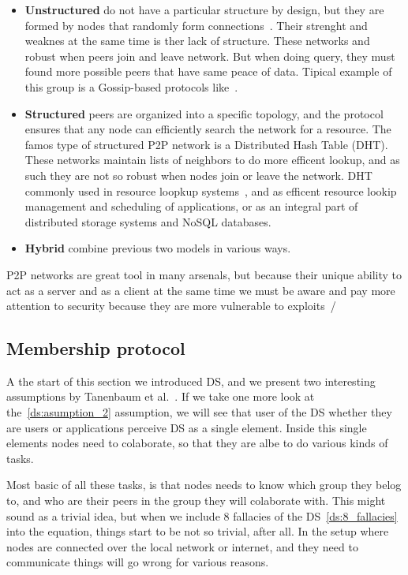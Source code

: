 \begin{itemize}
	\item \textbf{Unstructured} do not have a particular structure by design, but they are formed by nodes that randomly form connections~\cite{FilaliBHB11}. Their strenght and weaknes at the same time is ther lack of structure. These networks and robust when peers join and leave network. But when doing query, they must found more possible peers that have same peace of data. Tipical example of this group is a Gossip-based protocols like~\cite{DasGM02}.
	\item \textbf{Structured} peers are organized into a specific topology, and the protocol ensures that any node can efficiently search the network for a resource. The famos type of structured P2P network is a Distributed Hash Table (DHT). These networks maintain lists of neighbors to do more efficent lookup, and as such they are not so robust when nodes join or leave the network. DHT commonly used in resource loopkup systems~\cite{StoicaMKKB01}, and as efficent resource lookip management and scheduling of applications, or as an integral part of distributed storage systems and NoSQL\cite{Leavitt10} databases.
	\item \textbf{Hybrid} combine previous two models in various ways.
\end{itemize}

P2P networks are great tool in many arsenals, but because their unique ability to act as a server and as a client at the same time we must be aware and pay more attention to security because they are more vulnerable to exploits~\cite{0024003}/
%
%
\subsection{Membership protocol}\label{sec:memership_protocol}
%
A the start of this section we introduced DS, and we present two interesting assumptions by Tanenbaum et al.~\cite{SteenT16, 0019513}. If we take one more look at the~\ref{ds:asumption_2} assumption, we will see that user of the DS whether they are users or applications perceive DS as a single element. Inside this single elements nodes need to colaborate, so that they are albe to do various kinds of tasks.

Most basic of all these tasks, is that nodes needs to know which group they belog to, and who are their peers in the group they will colaborate with. This might sound as a trivial idea, but when we include 8 fallacies of the DS~\ref{ds:8_fallacies} into the equation, things start to be not so trivial, after all. In the setup where nodes are connected over the local network or internet, and they need to communicate things will go wrong for various reasons.

